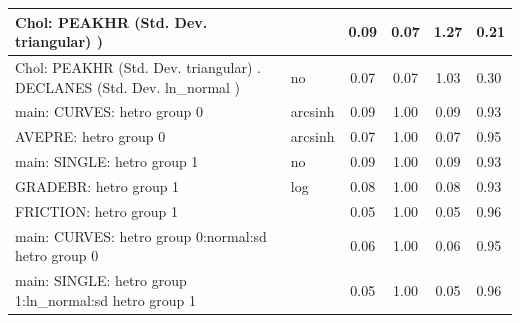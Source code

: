 \begin{table}
\begin{center}
\begin{tabular}{|l|l|c|c|c|l|}
			\hline
			 Chol: PEAKHR (Std. Dev. triangular) ) &  & 0.09 & 0.07 & 1.27 & 0.21 \\
			\hline
			 Chol: PEAKHR (Std. Dev. triangular) . DECLANES (Std. Dev.   ln_normal ) & no & 0.07 & 0.07 & 1.03 & 0.30 \\
			\hline
			main: CURVES: hetro group 0 & arcsinh & 0.09 & 1.00 & 0.09 & 0.93 \\
			\hline
			AVEPRE: hetro group 0 & arcsinh & 0.07 & 1.00 & 0.07 & 0.95 \\
			\hline
			main: SINGLE: hetro group 1 & no & 0.09 & 1.00 & 0.09 & 0.93 \\
			\hline
			GRADEBR: hetro group 1 & log & 0.08 & 1.00 & 0.08 & 0.93 \\
			\hline
			FRICTION: hetro group 1 &  & 0.05 & 1.00 & 0.05 & 0.96 \\
			\hline
			main: CURVES: hetro group 0:normal:sd  hetro group 0 &  & 0.06 & 1.00 & 0.06 & 0.95 \\
			\hline
			main: SINGLE: hetro group 1:ln_normal:sd  hetro group 1 &  & 0.05 & 1.00 & 0.05 & 0.96 \\
			\hline
		\end{tabular}
	\end{center}
\end{table}